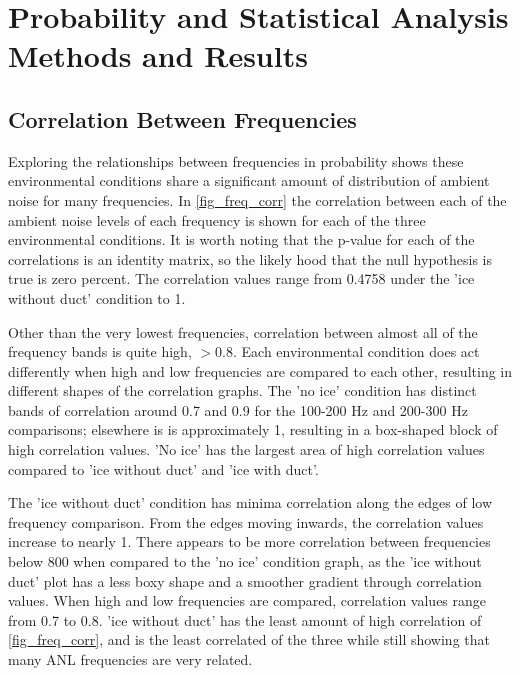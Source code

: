 \section{Probability and Statistical Analysis Methods and Results}

\subsection{Correlation Between Frequencies} \label{sec_corr_freq}

Exploring the relationships between frequencies in probability shows these environmental conditions share a significant amount of distribution of ambient noise for many frequencies. In \autoref{fig_freq_corr} the correlation between each of the ambient noise levels of each frequency is shown for each of the three environmental conditions. It is worth noting that the p-value for each of the correlations is an identity matrix, so the likely hood that the null hypothesis is true is zero percent. The correlation values range from 0.4758 under the 'ice without duct' condition to 1. 

Other than the very lowest frequencies, correlation between almost all of the frequency bands is quite high, $>0.8$.  Each environmental condition does act differently when high and low frequencies are compared to each other, resulting in different shapes of the correlation graphs. The 'no ice' condition has distinct bands of correlation around 0.7 and 0.9 for the 100-200 Hz and 200-300 Hz comparisons; elsewhere is is approximately 1, resulting in a box-shaped block of high correlation values. 'No ice' has the largest area of high correlation values compared to 'ice without duct' and 'ice with duct'.

The 'ice without duct' condition has minima correlation along the edges of low frequency comparison. From the edges moving inwards, the correlation values increase to nearly 1. There appears to be more correlation between frequencies below 800 when compared to the 'no ice' condition graph, as the 'ice without duct' plot has a less boxy shape and a smoother gradient through correlation values. When high and low frequencies are compared, correlation values range from 0.7 to 0.8. 'ice without duct' has the least amount of high correlation of \autoref{fig_freq_corr}, and is the least correlated of the three while still showing that many ANL frequencies are very related.

